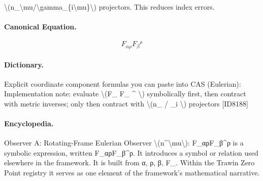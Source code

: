 \textbackslash{}(n\_\textbackslash{}mu/\textbackslash{}gamma\_\{i\textbackslash{}mu\}\textbackslash{}) projectors. This reduces index errors.

\paragraph{Canonical Equation.}
\[
F_{\alpha\rho}F_{\beta}{}^{\rho}
\]

\paragraph{Dictionary.}
Explicit coordinate component formulas you can paste into CAS (Eulerian): Implementation note: evaluate \textbackslash{}(F\_ F\_ \textasciicircum{} \textbackslash{}) symbolically first, then contract with metric inverses; only then contract with \textbackslash{}(n\_ / \_i \textbackslash{}) projectors [ID8188]

\paragraph{Encyclopedia.}
Observer A: Rotating-Frame Eulerian Observer \textbackslash{}(n\textasciicircum{}\textbackslash{}mu\textbackslash{}): F\_αρF\_β\textasciicircum{}ρ is a symbolic expression, written F\_αρF\_β\textasciicircum{}ρ. It introduces a symbol or relation used elsewhere in the framework. It is built from α, ρ, β, F\_. Within the Trawin Zero Point registry it serves as one element of the framework's mathematical narrative.
